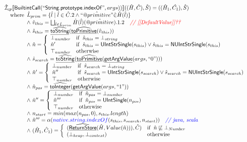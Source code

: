 \documentclass{article}
\makeatletter
\newcommand{\SF}[1]{\mbox{\textsf{#1}}}
\newcommand{\comment}[1]{\textit{#1}}
\newcommand{\wherec}[1]{{\rm where}\begin{array}[t]{l}#1\end{array}}
\newcommand{\ifc}[1]{{\rm if}\begin{array}[t]{l}#1\end{array}}
\newcommand{\owc}{{\rm otherwise}}
\newcommand{\aI}{\hat{\mathcal{I}}}
\newcommand{\lbr}{\llbracket}
\newcommand{\rbr}{\rrbracket}
\newcommand{\hf}[1]{\underline{\sf #1}}
\newcommand{\ahf}[1]{\widehat{\underline{\sf #1}}}
\newcommand{\avarprop}[1]{\hat{@#1}}
\def\inred{\color{red}}
\def\inblue{\color{blue}}
\def\inred{\color{red}}
\def\inblue{\color{blue}}
\makeatother
\begin{document}
\[\begin{array}{l}
\aI _{cp}\lbr \SF{BuiltintCall}(``\SF{String.prototype.indexOf}",args))\rbr((\hat{H},\hat{C}), \hat{S})
  = ((\hat{H}_1, \hat{C_1}), \hat{S})\\
\quad\wherec{ 
  \hat{L}_{prim} = \{ \hat{l} \mid \hat{l} \in \hat{C}.2 \land ``\avarprop{primitive}" \dot{\in}\hat{H}(\hat{l}) \}\\
  \land\ \hat{v}_{this} = \bigsqcup_{\hat{l} \in \hat{L}_{prim}} \hat{H}(\hat{l})(\avarprop{primitive}).1.2
    \quad\comment{{\inred // [[DefaultValue]]??}}\\
  \land\ \hat{s}_{this} = \ahf{toString}(\ahf{toPrimitive}(\hat{v}_{this}))\\
  \land\ \hat{n} = \left\{\begin{array}{ll}
      \bot_{number} & \ifc{\hat{s}_{this} = \bot_{string}}\\
      \hat{n}' & \ifc{\hat{s}_{this} = \SF{UIntStrSingle}(s_{this}) \lor \hat{s}_{this} = \SF{NUIntStrSingle}(s_{this}) }\\
      \top_{number} & \owc
    \end{array}\right.\\
  \land\ \hat{s}_{search} = \ahf{toString}(\ahf{toPrimitive}(\hf{getArgValue}(args, ``0")))\\  
  \land\ \hat{n}' = \left\{\begin{array}{ll}
      \bot_{number} & \ifc{\hat{s}_{search} = \bot_{string}}\\
      \hat{n}'' & \ifc{\hat{s}_{search} = \SF{UIntStrSingle}(s_{search}) \lor \hat{s}_{search} = \SF{NUIntStrSingle}(s_{search}) }\\
      \top_{number} & \owc
    \end{array}\right.\\
  \land\ \hat{n}_{pos} = \ahf{toInteger}(\hf{getArgValue}(args, ``1"))\\
  \land\ \hat{n}'' = \left\{\begin{array}{ll}
      \bot_{number} & \ifc{\hat{n}_{pos} = \bot_{number}}\\
      \hat{n}''' & \ifc{\hat{n}_{pos} = \SF{UIntSingle}(n_{pos})}\\
      \top_{number} & \owc
    \end{array}\right.\\
  \land\ n_{start} = min(max(n_{pos}, 0), s_{this}.length)\\
  \land\ \hat{n}''' = \alpha({\inblue native.string.indexOf}(s_{this}, s_{search}, n_{start}))
    \quad\comment{{\inblue // java, scala}}\\  
  \land\ (\hat{H}_1, \hat{C}_1) = 
    \left\{\begin{array}{ll}
      (\ahf{ReturnStore}(\hat{H}, Value(\hat{n}))), \hat{C})
      & \ifc{\hat{n} \not\sqsubseteq \bot_{Number}}\\
      (\bot_{heap}, \bot_{context}) & \owc \\
    \end{array}\right.\\
  }\\
\\\\




\end{array}\]
\end{document}
